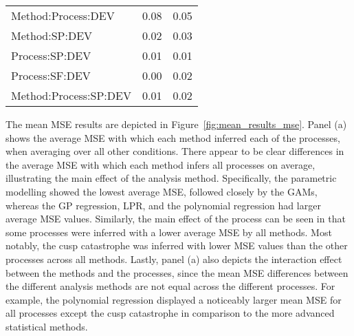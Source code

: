 \documentclass[man, floatsintext]{apa7}
\begin{document}
\begin{table}[tbp]
\begin{center}
\begin{threeparttable}
\begin{tabular}{lll}
        \\
        Method:Process:DEV    & 0.08                                     & 0.05
        \\
        Method:SP:DEV         & 0.02                                     & 0.03
        \\
        Process:SP:DEV        & 0.01                                     & 0.01
        \\
        Process:SF:DEV        & 0.00                                     & 0.02
        \\
        Method:Process:SP:DEV & 0.01                                     & 0.02
        \\
        \bottomrule
      \end{tabular}
    \end{threeparttable}
  \end{center}
\end{table}

The mean MSE results are depicted in Figure~\ref{fig:mean_results_mse}. Panel
(a) shows the average MSE with which each method inferred each of the
processes, when averaging over all other conditions. There appear to be clear
differences in the average MSE with which each method infers all processes on
average, illustrating the main effect of the analysis method. Specifically, the
parametric modelling showed the lowest average MSE, followed closely by the
GAMs, whereas the GP regression, LPR, and the polynomial regression had larger
average MSE values. Similarly, the main effect of the process can be seen in
that some processes were inferred with a lower average MSE by all methods. Most
notably, the cusp catastrophe was inferred with lower MSE values than the other
processes across all methods. Lastly, panel (a) also depicts the interaction
effect between the methods and the processes, since the mean MSE differences
between the different analysis methods are not equal across the different
processes. For example, the polynomial regression displayed a noticeably larger
mean MSE for all processes except the cusp catastrophe in comparison to the
more advanced statistical methods.

\begin{sidewaysfigure*}[htbp]
  \caption{Mean MSE effects across all processes, analysis
    methods, and simulation conditions}
  \label{fig:mean_results_mse}
\end{sidewaysfigure*}
\end{document}
